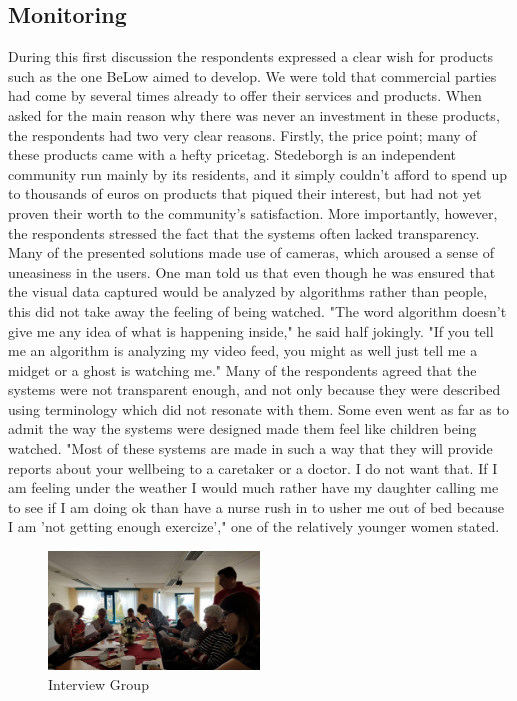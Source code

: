 \documentclass{below-ext}
\begin{document}
\subsection{Monitoring}
During this first discussion the respondents expressed a clear wish for products such as the one BeLow aimed to develop. We were told that commercial parties had come by several times already to offer their services and products. When asked for the main reason why there was never an investment in these products, the respondents had two very clear reasons. Firstly, the price point; many of these products came with a hefty pricetag. Stedeborgh is an independent community run mainly by its residents, and it simply couldn't afford to spend up to thousands of euros on products that piqued their interest, but had not yet proven their worth to the community's satisfaction. More importantly, however, the respondents stressed the fact that the systems often lacked transparency. Many of the presented solutions made use of cameras, which aroused a sense of uneasiness in the users. One man told us that even though he was ensured that the visual data captured would be analyzed by algorithms rather than people, this did not take away the feeling of being watched. "The word algorithm doesn't give me any idea of what is happening inside," he said half jokingly. "If you tell me an algorithm is analyzing my video feed, you might as well just tell me a midget or a ghost is watching me." Many of the respondents agreed that the systems were not transparent enough, and not only because they were described using terminology which did not resonate with them. Some even went as far as to admit the way the systems were designed made them feel like children being watched. "Most of these systems are made in such a way that they will provide reports about your wellbeing to a caretaker or a doctor. I do not want that. If I am feeling under the weather I would much rather have my daughter calling me to see if I am doing ok than have a nurse rush in to usher me out of bed because I am 'not getting enough exercize'," one of the relatively younger women stated. 

\begin{figure}
\center
\label{fig:interview}
\includegraphics[width=0.5\textwidth]{interview}
\caption{Interview Group}
\end{figure}
\end{document}
